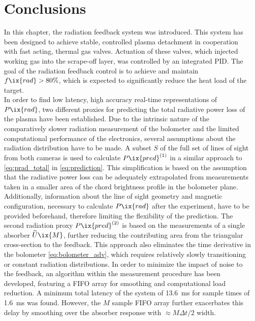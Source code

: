     \section{Conclusions}\label{sec:conclusionschap2}%
%
        In this chapter, the radiation feedback system was introduced. This system has been designed to achieve stable, controlled plasma detachment in cooperation with fast acting, thermal gas valves. Actuation of these valves, which injected working gas into the scrape-off layer, was controlled by an integrated PID. The goal of the radiation feedback control is to achieve and maintain $f\ix{rad}>80\%$, which is expected to significantly reduce the heat load of the target.\\%
        In order to find low latency, high accuracy real-time representations of $P\ix{rad}$, two different proxies for predicting the total radiative power loss of the plasma have been established. Due to the intrinsic nature of the comparatively slower radiation measurement of the bolometer and the limited computational performance of the electronics, several assumptions about the radiation distribution have to be made. A subset $S$ of the full set of lines of sight from both cameras is used to calculate $P\ix{pred}^{\left(1\right)}$ in a similar approach to \cref{eq:prad_total} in \cref{eq:prediction}. This simplification is based on the assumption that the radiative power loss can be adequately extrapolated from measurements taken in a smaller area of the chord brightness profile in the bolometer plane. Additionally, information about the line of sight geometry and magnetic configuration, necessary to calculate $P\ix{rad}$ after the experiment, have to be provided beforehand, therefore limiting the flexibility of the prediction. The second radiation proxy $P\ix{pred}^{\left(2\right)}$ is based on the measurements of a single absorber $\widetilde{U}\ix{M}$, further reducing the contributing area from the triangular cross-section to the feedback. This approach also eliminates the time derivative in the bolometer \cref{eq:bolometer_adv}, which requires relatively slowly transitioning or constant radiation distributions. In order to minimize the impact of noise to the feedback, an algorithm within the measurement procedure has been developed, featuring a FIFO array for smoothing and computational load reduction. A minimum total latency of the system of \SI{13.6}{\milli\second} for sample times of \SI{1.6}{\milli\second} was found. However, the $M$ sample FIFO array further exacerbates this delay by smoothing over the absorber response with $\approx M\Delta t/2$ width.\\%
